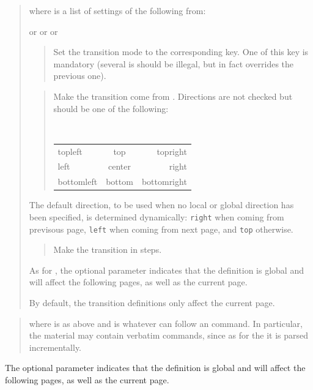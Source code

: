 \documentclass[12pt]{article}
\begin{document}
\docdef \advitransition \doctt {[global]}
\begin{quote}
where  is a list of settings of the following from:

 or  or  or 
\begin{quote}
Set the transition mode to the corresponding key.
One of this key is mandatory (several is should be illegal, but in fact
overrides the previous one). 
\end{quote}

\begin{quote}
Make the transition come from .  Directions are not checked
but should be one of the following: 
\begin{center}
\tt
\begin{tabular}{l@{\qquad}c@{\qquad}r}
topleft&   top& topright\\
left&  center&  right \\
bottomleft& bottom & bottomright\\
\end{tabular}
\end{center}
\end{quote}
The default direction, to be used when no local or global direction has been
specified, is determined dynamically: \verb"right" when coming from
previsous page, \verb"left" when coming from next page, and \verb"top"
otherwise.

\begin{quote}
Make the transition in  steps. 
\end{quote}
As for \docdef \advibg, the optional parameter  indicates that
the definition is global and will affect the following pages, 
as well as the current page. 

By default, the transition definitions only affect the current page. 
\end{quote}

\medskip\noindent
\docdef \advitransbox {}
\begin{quote}
where  is as above and  is
whatever can follow an \docdef \hbox{} command. In particular, the material
may contain verbatim commands, since as for the \docdef\hbox{} it is 
parsed incrementally.
\end{quote}

The optional parameter  indicates that
the definition is global and will affect the following pages, 
as well as the current page.
\end{document}
